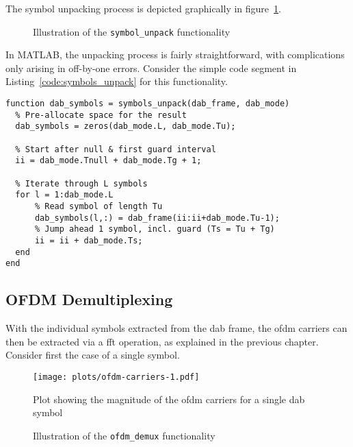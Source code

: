 \documentclass[class=report,11pt,crop=false]{standalone}
\begin{document}
The symbol unpacking process is depicted graphically in figure~\ref{fig:symbols_unpack}.

\begin{figure}[htbp]
  \centering
  \captionsetup{type=figure}
  \def\svgwidth{\linewidth}
  { %
      }
  \caption{Illustration of the \texttt{symbol\_unpack} functionality}
  \label{fig:symbols_unpack}
\end{figure}

In MATLAB, the unpacking process is fairly straightforward, with complications only arising in off-by-one errors. Consider the simple code segment in Listing~\ref{code:symbols_unpack} for this functionality.

\begin{lstlisting}[caption={Code used in the \texttt{symbols\_unpack} function}, label={code:symbols_unpack}]
function dab_symbols = symbols_unpack(dab_frame, dab_mode)
  % Pre-allocate space for the result
  dab_symbols = zeros(dab_mode.L, dab_mode.Tu);

  % Start after null & first guard interval
  ii = dab_mode.Tnull + dab_mode.Tg + 1;

  % Iterate through L symbols
  for l = 1:dab_mode.L
      % Read symbol of length Tu
      dab_symbols(l,:) = dab_frame(ii:ii+dab_mode.Tu-1);
      % Jump ahead 1 symbol, incl. guard (Ts = Tu + Tg)
      ii = ii + dab_mode.Ts;
  end
end
\end{lstlisting}

\subsection{OFDM Demultiplexing \label{subsect:dab-proc_ofdm-demux}}
With the individual symbols extracted from the \gls{dab} frame, the \gls{ofdm} carriers can then be extracted via a \gls{fft} operation, as explained in the previous chapter. Consider first the case of a single symbol.

\begin{figure}[htbp]
  \centering
  \captionsetup{type=figure}
  \texttt{[image: plots/ofdm-carriers-1.pdf]}
  \caption{Plot showing the magnitude of the \gls{ofdm} carriers for a single \gls{dab} symbol}
  \label{fig:ofdm-carriers-1}
\end{figure}


\begin{figure}[htbp]
  \centering
  \captionsetup{type=figure}
  \def\svgwidth{\linewidth}
  { %
      }
  \caption{Illustration of the \texttt{ofdm\_demux} functionality}
  \label{fig:ofdm_demux}
\end{figure}
\end{document}
